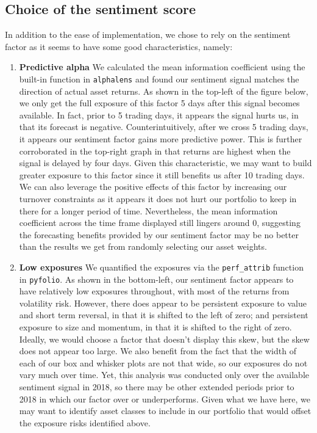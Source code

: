 \documentclass[11pt,]{article}
\begin{document}
\subsection{Choice of the sentiment
score}\label{choice-of-the-sentiment-score}

In addition to the ease of implementation, we chose to rely on the
sentiment factor as it seems to have some good characteristics, namely:

\begin{enumerate}
\def\labelenumi{\arabic{enumi}.}
\item
  \textbf{Predictive alpha} We calculated the mean information
  coefficient using the built-in function in \texttt{alphalens} and
  found our sentiment signal matches the direction of actual asset
  returns. As shown in the top-left of the figure below, we only get the
  full exposure of this factor 5 days after this signal becomes
  available. In fact, prior to 5 trading days, it appears the signal
  hurts us, in that its forecast is negative. Counterintuitively, after
  we cross 5 trading days, it appears our sentiment factor gains more
  predictive power. This is further corroborated in the top-right graph
  in that returns are highest when the signal is delayed by four days.
  Given this characteristic, we may want to build greater exposure to
  this factor since it still benefits us after 10 trading days. We can
  also leverage the positive effects of this factor by increasing our
  turnover constraints as it appears it does not hurt our portfolio to
  keep in there for a longer period of time. Nevertheless, the mean
  information coefficient across the time frame displayed still lingers
  around 0, suggesting the forecasting benefits provided by our
  sentiment factor may be no better than the results we get from
  randomly selecting our asset weights.
\item
  \textbf{Low exposures} We quantified the exposures via the
  \texttt{perf\_attrib} function in \texttt{pyfolio}. As shown in the
  bottom-left, our sentiment factor appears to have relatively low
  exposures throughout, with most of the returns from volatility risk.
  However, there does appear to be persistent exposure to value and
  short term reversal, in that it is shifted to the left of zero; and
  persistent exposure to size and momentum, in that it is shifted to the
  right of zero. Ideally, we would choose a factor that doesn't display
  this skew, but the skew does not appear too large. We also benefit
  from the fact that the width of each of our box and whisker plots are
  not that wide, so our exposures do not vary much over time. Yet, this
  analysis was conducted only over the available sentiment signal in
  2018, so there may be other extended periods prior to 2018 in which
  our factor over or underperforms. Given what we have here, we may want
  to identify asset classes to include in our portfolio that would
  offset the exposure risks identified above.
\end{enumerate}
\end{document}
